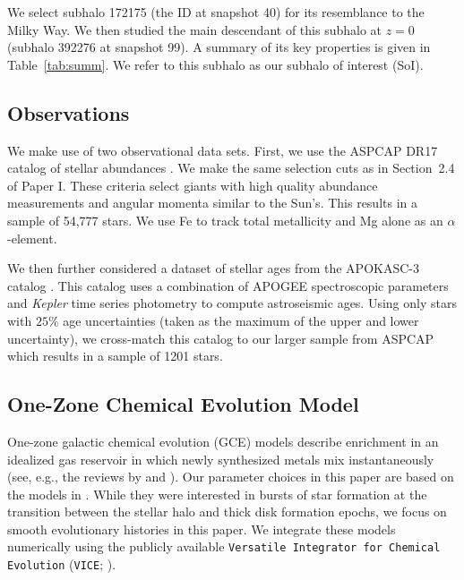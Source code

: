 \documentclass[twocolumn]{aastex631}
\begin{document}
We select subhalo 172175 (the ID at snapshot 40) for its resemblance to the Milky Way. We then studied the main descendant of this subhalo at $z=0$ (subhalo 392276 at snapshot 99). A summary of its key properties is given in Table~\ref{tab:summ}. We refer to this subhalo as our subhalo of interest (SoI).

\subsection{Observations}\label{ssec:obs}
We make use of two observational data sets. First, we use the ASPCAP DR17 catalog of stellar abundances \citep[][J.A.~Holtzman et al., in preparation]{2016AJ....151..144G}. We make the same selection cuts as in Section~2.4 of Paper I. These criteria select giants with high quality abundance measurements and angular momenta similar to the Sun's. This results in a sample of 54,777 stars. We use Fe to track total metallicity and Mg alone as an $\alpha$-element.

We then further considered a dataset of stellar ages from the APOKASC-3 catalog \citep{2024arXiv241000102P}. This catalog uses a combination of APOGEE spectroscopic parameters and \textit{Kepler} time series photometry to compute astroseismic ages. Using only stars with $25\%$ age uncertainties (taken as the maximum of the upper and lower uncertainty), we cross-match this catalog to our larger sample from ASPCAP which results in a sample of 1201 stars.

\subsection{One-Zone Chemical Evolution Model}\label{ssec:onezone_met}
One-zone galactic chemical evolution (GCE) models describe enrichment in an idealized gas reservoir in which newly synthesized metals mix instantaneously (see, e.g., the reviews by \citealt{Tinsley1980} and \citealt{Matteucci2021}). Our parameter choices in this paper are based on the models in \citet{2022arXiv220402989C}. While they were interested in bursts of star formation at the transition between the stellar halo and thick disk formation epochs, we focus on smooth evolutionary histories in this paper. We integrate these models numerically using the publicly available {\tt Versatile Integrator for Chemical Evolution} ({\tt VICE}; \citealt{2020MNRAS.498.1364J}).
\end{document}
